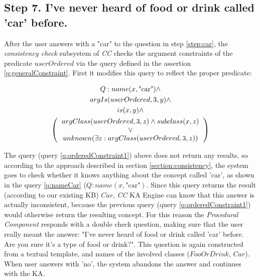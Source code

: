 \subsection{Step 7. I've never heard of food or drink called 'car' before.}
\label{section:step7}
After the user answers with a "car" to the question in step \ref{step:car}, the
\emph{consistency check} subsystem of \emph{CC} checks the argument constraints
of the predicate $userOrdered$ via the query defined in the assertion 
\ref{q:generalConstraint}. First it modifies this query to reflect the proper
predicate:

\begin{equation}\label{q:orderedConstraint1}
\begin{gathered}
   Q:name(x,\text{"car"})\land \\ 
    argIs(userOrdered,3,y)\land \\
    is(x,y)\land \\
    \left(
    \begin{tabular}{c}
        $argClass(userOrdered,3,z) \land  subclass(x,z)$\\
        $\lor$\\
        $unknown(\exists z: argClass(userOrdered,3,z))$ \\
    \end{tabular}
    \right)
\end{gathered}
\end{equation}

The query (query \ref{q:orderedConstraint1}) above does not return any results,
so according to the approach described in section \ref{section:consistency}, 
the system goes to check whether it knows anything about the concept called 
'car', as shown in the query \ref{q:nameCar} ($Q:name(x,\text{"car"})$.
Since this query returns the result (according to our existing KB) $Car$, 
\emph{CC} KA Engine can know that this answer is actually inconsistent, because
the previous query (query \ref{q:orderedConstraint1}) would otherwise return
the resulting concept.
For this reason the \emph{Procedural Component} responds with a double check
question, making sure that the user really meant the answer: 
"I've never heard of food or drink called 'car' before. Are you sure it's a type 
of food or drink?". This question is again constructed from a textual template,
and names of the involved classes ($FooOrDrink$, $Car$). When user answers with
'no', the system abandons the answer and continues with the KA.

